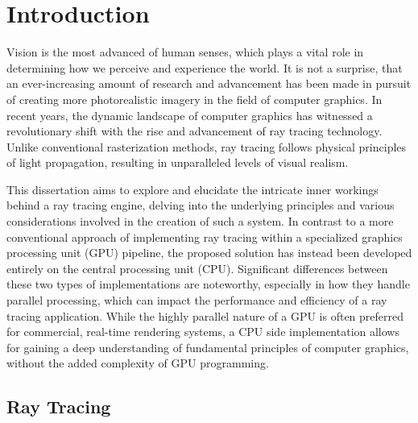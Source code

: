 
\chapter{Introduction} \label{ch:Introduction}

Vision is the most advanced of human senses, which plays a vital role in determining how we perceive and experience the world.
It is not a surprise, that an ever-increasing amount of research and advancement has been made in pursuit of creating more photorealistic imagery in the field of computer graphics. 
In recent years, the dynamic landscape of computer graphics has witnessed a revolutionary shift with the rise and advancement of ray tracing technology. 
Unlike conventional rasterization methods, ray tracing follows physical principles of light propagation, resulting in unparalleled levels of visual realism. 

This dissertation aims to explore and elucidate the intricate inner workings behind a ray tracing engine, delving into the underlying principles and various considerations involved in the creation of such a system.
In contrast to a more conventional approach of implementing ray tracing within a specialized graphics processing unit (GPU) pipeline, the proposed solution has instead been developed entirely on the central processing unit (CPU). 
Significant differences between these two types of implementations are noteworthy, especially in how they handle parallel processing, which can impact the performance and efficiency of a ray tracing application. 
While the highly parallel nature of a GPU is often preferred for commercial, real-time rendering systems, a CPU side implementation allows for gaining a deep understanding of fundamental principles of computer graphics, without the added complexity of GPU programming.

\section{Ray Tracing}

